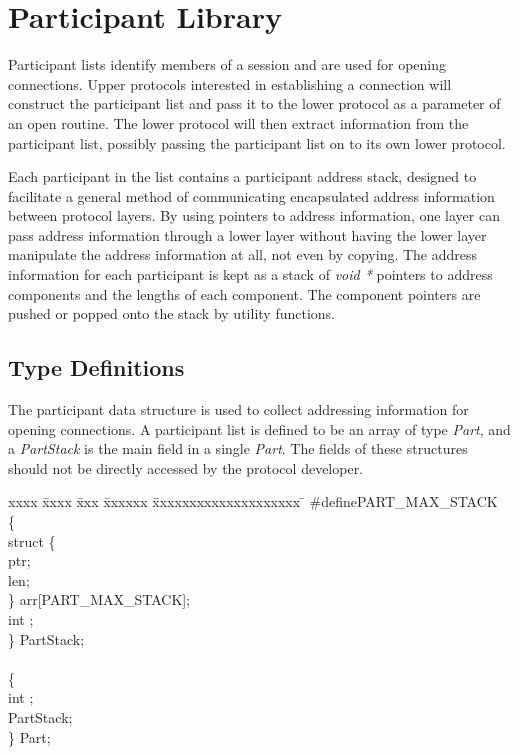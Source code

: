 %
%
%

\section{Participant Library}\label{part}

Participant lists identify members of a session and are used for
opening connections.  Upper protocols interested in establishing a
connection will construct the participant list and pass it to the
lower protocol as a parameter of an open routine.  The lower protocol
will then extract information from the participant list, possibly
passing the participant list on to its own lower protocol.

Each participant in the list contains a participant address stack,
designed to facilitate a general method of communicating encapsulated
address information between protocol layers.  By using pointers to
address information, one layer can pass address information through a
lower layer without having the lower layer manipulate the address
information at all, not even by copying.  The address information for
each participant is kept as a stack of {\em void *} pointers to
address components and the lengths of each component.
The component pointers are pushed or popped onto
the stack by utility functions.

\subsection{Type Definitions}

The participant data structure is used to collect addressing
information for opening connections.  A participant list is defined to
be an array of type {\em Part}, and a {\em PartStack} is the main
field in a single {\em Part}. The fields of these structures should
not be directly accessed by the protocol developer.

\begin{tabbing}
xxxx \= xxxx \= xxx \= xxxxxx \= xxxxxxxxxxxxxxxxxxxx \= \kill
\>\#define\>\>\>PART\_MAX\_STACK\\

  \{\\
\>\>    struct \{\\
\>\>            \>ptr;\\
\>\>               \>len;\\
\>\>    \} {\caps arr}[PART\_MAX\_STACK];\\
\>\>    {\sem int}	\>;\\
\>\} {\bold PartStack};\\
\\
 \{\\
\>\>    {\sem int}	\>;\\
\>\>    {\sem PartStack}\>; \\
\>\} {\bold Part};
\end{tabbing}

